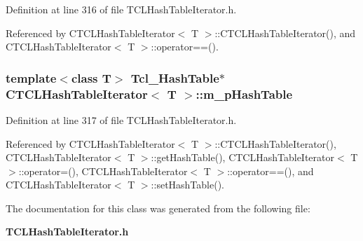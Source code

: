 Definition at line 316 of file TCLHash\-Table\-Iterator.h.

Referenced by CTCLHash\-Table\-Iterator$<$ T $>$::CTCLHash\-Table\-Iterator(), and CTCLHash\-Table\-Iterator$<$ T $>$::operator==().
\subsubsection{\setlength{\rightskip}{0pt plus 5cm}template$<$class T$>$ Tcl\_\-Hash\-Table$\ast$ CTCLHash\-Table\-Iterator$<$ T $>$::m\_\-p\-Hash\-Table\hspace{0.3cm}{\tt  [private]}}\label{classCTCLHashTableIterator_o2}




Definition at line 317 of file TCLHash\-Table\-Iterator.h.

Referenced by CTCLHash\-Table\-Iterator$<$ T $>$::CTCLHash\-Table\-Iterator(), CTCLHash\-Table\-Iterator$<$ T $>$::get\-Hash\-Table(), CTCLHash\-Table\-Iterator$<$ T $>$::operator=(), CTCLHash\-Table\-Iterator$<$ T $>$::operator==(), and CTCLHash\-Table\-Iterator$<$ T $>$::set\-Hash\-Table().

The documentation for this class was generated from the following file:\begin{CompactItemize}
\item 
{\bf TCLHash\-Table\-Iterator.h}\end{CompactItemize}
